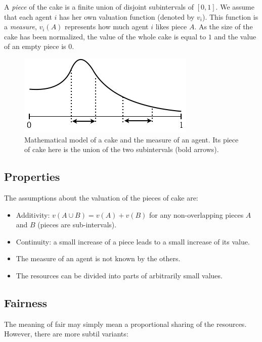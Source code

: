 A \textit{piece} of the cake is a finite union of disjoint subintervals of $[0,1]$.
We assume that each agent $i$ has her own valuation function (denoted by $v_i$).
This function is a \textit{measure}, $v_i(A)$ represents how much agent $i$ likes piece $A$. 
As the size of the cake has been normalized, the value of the whole cake is equal to $1$
and the value of an empty piece is $0$.
\begin{figure}[htb]
\begin{center}
        \includegraphics[scale=0.5]{FiguresMaths/cakeMeasure}
        \caption{Mathematical model of a cake and the measure of an agent. Its piece of cake here is the union of the two subintervals (bold arrows).}
        \label{Fig:cakeMeasure}
\end{center}
\end{figure}

\subsection{Properties}

The assumptions about the valuation of the pieces of cake are:
\begin{itemize}
\item Additivity: $v(A \cup B) = v(A) + v(B)$ for any non-overlapping pieces $A$ and $B$
(pieces are sub-intervals). 
\item 
Continuity: a small increase of a piece leads to a small increase of its value. 
\item The measure of an agent is not known by the others.
\item The resources can be divided into parts of arbitrarily small values.
\end{itemize}

\subsection{Fairness}

The meaning of fair may simply mean a proportional sharing of the resources. 
However, there are more subtil variants:

